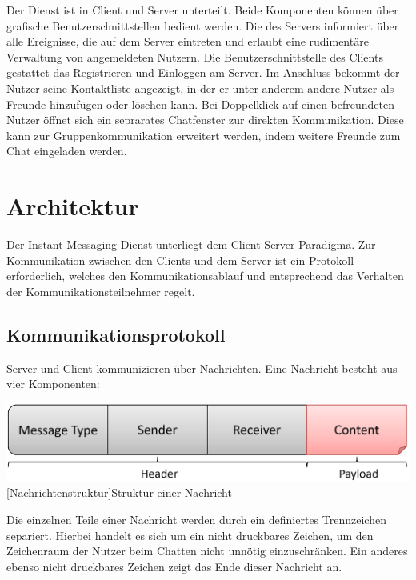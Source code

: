 \documentclass[12pt,a4paper,bibliography=totocnumbered,listof=totocnumbered]{scrartcl}
\begin{document}
Der Dienst ist in Client und Server unterteilt. Beide Komponenten können über grafische Benutzerschnittstellen bedient werden. Die des Servers informiert über alle Ereignisse, die auf dem Server eintreten und erlaubt eine rudimentäre Verwaltung von angemeldeten Nutzern. 
Die Benutzerschnittstelle des Clients gestattet das Registrieren und Einloggen am Server. Im Anschluss bekommt der Nutzer seine Kontaktliste angezeigt, in der er unter anderem andere Nutzer als Freunde hinzufügen oder löschen kann. Bei Doppelklick auf einen befreundeten Nutzer öffnet sich ein seprarates Chatfenster zur direkten Kommunikation. Diese kann zur Gruppenkommunikation erweitert werden, indem weitere Freunde zum Chat eingeladen werden.

\section{Architektur}
Der Instant-Messaging-Dienst unterliegt dem Client-Server-Paradigma. Zur Kommunikation zwischen den Clients und dem Server ist ein Protokoll erforderlich, welches den Kommunikationsablauf und entsprechend das Verhalten der Kommunikationsteilnehmer regelt.

\subsection{Kommunikationsprotokoll}
Server und Client kommunizieren über Nachrichten. Eine Nachricht besteht aus vier Komponenten:

\vspace{1em}
\begin{minipage}{\linewidth}
	\centering
	\includegraphics[width=0.7\linewidth]{img/Nachrichtenstruktur.png}
	[Nachrichtenstruktur]{Struktur einer Nachricht}
	\label{fig:Nachrichtenstruktur}
\end{minipage}
\vspace{0.5em}

Die einzelnen Teile einer Nachricht werden durch ein definiertes Trennzeichen separiert. Hierbei handelt es sich um ein nicht druckbares Zeichen, um den Zeichenraum der Nutzer beim Chatten nicht unnötig einzuschränken. Ein anderes ebenso nicht druckbares Zeichen zeigt das Ende dieser Nachricht an.
\end{document}
